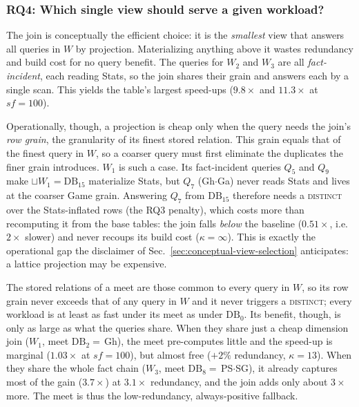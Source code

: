\documentclass[sigconf]{acmart}
\begin{document}
\raggedbottom

\subsubsection{RQ4: Which single view should serve a given workload?}

The join is conceptually the efficient choice: it is the \emph{smallest} view that answers all queries in $W$ by projection. Materializing anything above it wastes redundancy and build cost for no query benefit. The queries for $W_2$ and $W_3$ are all \emph{fact-incident}, each reading \textsf{Stats}, so the join shares their grain and answers each by a single scan. This yields the table's largest speed-ups ($9.8\times$ and $11.3\times$ at $sf=100$).

Operationally, though, a projection is cheap only when the query needs the join's \emph{row grain}, the granularity of its finest stored relation. This grain equals that of the finest query in $W$, so a coarser query must first eliminate the duplicates the finer grain introduces. $W_1$ is such a case. Its fact-incident queries $Q_5$ and $Q_9$ make $\sqcup W_1=\mathrm{DB}_{15}$ materialize \textsf{Stats}, but $Q_7$ (Gh$\cdot$Ga) never reads \textsf{Stats} and lives at the coarser \textsf{Game} grain. Answering $Q_7$ from $\mathrm{DB}_{15}$ therefore needs a \textsc{distinct} over the \textsf{Stats}-inflated rows (the RQ3 penalty), which costs more than recomputing it from the base tables: the join falls \emph{below} the baseline ($0.51\times$, i.e.\ $2\times$ slower) and never recoups its build cost ($\kappa=\infty$). This is exactly the operational gap the disclaimer of Sec.~\ref{sec:conceptual-view-selection} anticipates: a lattice projection may be expensive.

The stored relations of a meet are those common to every query in $W$, so its row grain never exceeds that of any query in $W$ and it never triggers a \textsc{distinct}; every workload is at least as fast under its meet as under $\mathrm{DB}_0$. Its benefit, though, is only as large as what the queries share. When they share just a cheap dimension join ($W_1$, meet $\mathrm{DB}_2=$\,Gh), the meet pre-computes little and the speed-up is marginal ($1.03\times$ at $sf=100$), but almost free ($+2\%$ redundancy, $\kappa=13$). When they share the whole fact chain ($W_3$, meet $\mathrm{DB}_8=$\,PS$\cdot$SG), it already captures most of the gain ($3.7\times$) at $3.1\times$ redundancy, and the join adds only about $3\times$ more. The meet is thus the low-redundancy, always-positive fallback.
\end{document}
